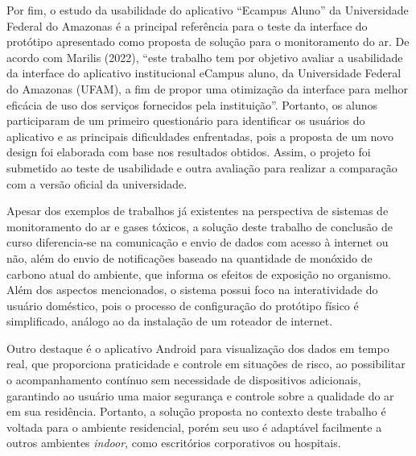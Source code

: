 Por fim, o estudo da usabilidade do aplicativo ``Ecampus Aluno'' da Universidade Federal do Amazonas \cite{ufam-design} é a principal referência para o 
teste da interface do protótipo apresentado como proposta de solução para o monitoramento do ar. De acordo com Marilis (2022), ``este trabalho tem por objetivo avaliar 
a usabilidade da interface do aplicativo institucional eCampus aluno, da Universidade Federal do Amazonas (UFAM), a fim de propor uma otimização da interface para 
melhor eficácia de uso dos serviços fornecidos pela instituição''. Portanto, os alunos participaram de um primeiro questionário para 
identificar os usuários do aplicativo e as principais dificuldades enfrentadas, pois a proposta de um novo design 
foi elaborada com base nos resultados obtidos. Assim, o projeto foi submetido ao teste de usabilidade e outra avaliação para realizar a comparação com a versão oficial da
universidade. 

Apesar dos exemplos de trabalhos já existentes na perspectiva de sistemas de monitoramento do ar e gases tóxicos, a solução deste trabalho de conclusão de curso diferencia-se na comunicação e envio de dados com acesso à internet ou não, além do envio de notificações 
baseado na quantidade de monóxido de carbono atual do ambiente, que informa os efeitos de exposição no organismo. Além dos aspectos mencionados, o sistema possui foco na interatividade do usuário doméstico, pois o processo de configuração do protótipo físico é
simplificado, análogo ao da instalação de um roteador de internet.

Outro destaque é o aplicativo Android para visualização dos dados em tempo real, que proporciona praticidade e controle em situações de risco, ao possibilitar o acompanhamento contínuo 
sem necessidade de dispositivos adicionais, garantindo ao usuário uma maior segurança e controle sobre a qualidade do ar em sua residência. Portanto, a solução proposta no contexto deste trabalho é voltada para o ambiente residencial, porém seu uso é adaptável facilmente a outros ambientes \textit{indoor}, como escritórios corporativos ou hospitais. 